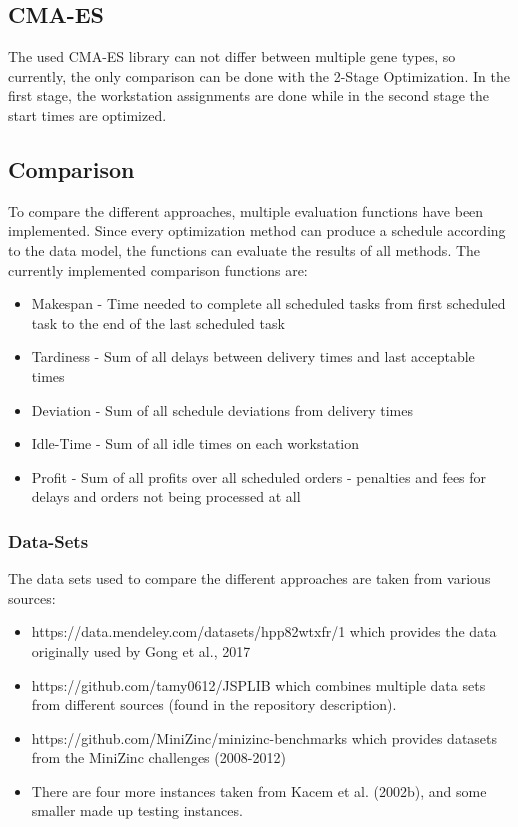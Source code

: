 \documentclass[a4paper,12pt,twoside]{scrreprt}
\begin{document}
\begin{flushleft}
\subsection{CMA-ES}
The used CMA-ES library can not differ between multiple gene types, so currently, the only comparison can be done with the 2-Stage Optimization. In the first stage, the workstation assignments are done while in the second stage the start times are optimized. 

\subsection{Comparison}

To compare the different approaches, multiple evaluation functions have been implemented. Since every optimization method can produce a schedule according to the data model, the functions can evaluate the results of all methods.
The currently implemented comparison functions are:

\begin{itemize}
	\item Makespan - Time needed to complete all scheduled tasks from first scheduled task to the end of the last scheduled task
	\item Tardiness - Sum of all delays between delivery times and last acceptable times
	\item Deviation - Sum of all schedule deviations from delivery times
	\item Idle-Time - Sum of all idle times on each workstation
	\item Profit - Sum of all profits over all scheduled orders - penalties and fees for delays and orders not being processed at all
\end{itemize}

\subsubsection{Data-Sets}
	The data sets used to compare the different approaches are taken from various sources:
	\begin{itemize}	
		\item https://data.mendeley.com/datasets/hpp82wtxfr/1 which provides the data originally used by Gong et al., 2017 \newline
		\item https://github.com/tamy0612/JSPLIB which combines multiple data sets from different sources (found in the repository description). \newline
		\item https://github.com/MiniZinc/minizinc-benchmarks which provides datasets from the MiniZinc challenges (2008-2012) \newline
		\item There are four more instances taken from Kacem et al. (2002b), and some smaller made up testing instances.
	\end{itemize}

\end{flushleft}
\end{document}
